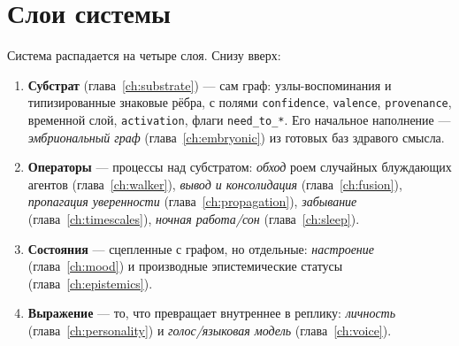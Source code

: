 \section{Слои системы}

Система распадается на четыре слоя. Снизу вверх:

\begin{enumerate}
\item \textbf{Субстрат} (глава~\ref{ch:substrate}) — сам граф: узлы-воспоминания и
типизированные знаковые рёбра, с полями \texttt{confidence}, \texttt{valence},
\texttt{provenance}, временной слой, \texttt{activation}, флаги \texttt{need\_to\_*}.
Его начальное наполнение — \emph{эмбриональный граф}
(глава~\ref{ch:embryonic}) из готовых баз здравого смысла.
\item \textbf{Операторы} — процессы над субстратом:
\emph{обход} роем случайных блуждающих агентов (глава~\ref{ch:walker}),
\emph{вывод и консолидация} (глава~\ref{ch:fusion}),
\emph{пропагация уверенности} (глава~\ref{ch:propagation}),
\emph{забывание} (глава~\ref{ch:timescales}),
\emph{ночная работа/сон} (глава~\ref{ch:sleep}).
\item \textbf{Состояния} — сцепленные с графом, но отдельные:
\emph{настроение} (глава~\ref{ch:mood}) и производные эпистемические статусы
(глава~\ref{ch:epistemics}).
\item \textbf{Выражение} — то, что превращает внутреннее в реплику:
\emph{личность} (глава~\ref{ch:personality}) и \emph{голос/языковая модель}
(глава~\ref{ch:voice}).
\end{enumerate}

\begin{center}
\label{fig:layers}
\end{center}

